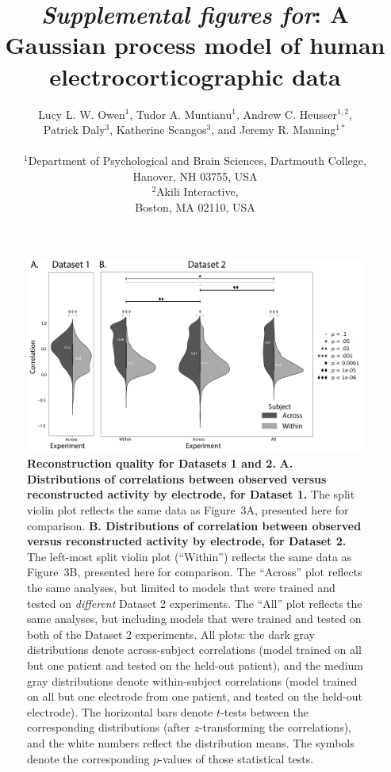 \documentclass[10pt]{article}
\title{\textit{Supplemental figures for}: A Gaussian process model of human electrocorticographic data}
\author{
  Lucy L. W. Owen$^{1}$,
  Tudor A. Muntianu$^{1}$,
  Andrew C. Heusser$^{1, 2}$, \\
  Patrick Daly$^{3}$,
  Katherine Scangos$^{3}$, and
  Jeremy R. Manning$^{1\ast}$\\\\
$^{1}$Department of Psychological and Brain Sciences, Dartmouth College,\\
Hanover, NH 03755, USA\\
$^{2}$Akili Interactive,\\
Boston, MA 02110, USA}
\begin{document}
\setcounter{equation}{0}
\setcounter{figure}{0}
\setcounter{table}{0}
\setcounter{page}{1}
\setcounter{section}{0}
\makeatletter
\renewcommand{\theequation}{S\arabic{equation}}
\renewcommand{\thefigure}{S\arabic{figure}}

\begin{titlepage}
  \maketitle
\end{titlepage}

\begin{figure}[b!]
\centering
\includegraphics[width=\textwidth]{figs/supplemental_1}
\caption{\textbf{Reconstruction quality for Datasets 1 and 2.}
  \textbf{A. Distributions of correlations between observed versus
    reconstructed activity by electrode, for Dataset 1.} The split
  violin plot reflects the same data as Figure~3A, presented here for
  comparison.  \textbf{B. Distributions of correlation between
    observed versus reconstructed activity by electrode, for Dataset
    2.}  The left-most split violin plot (``Within'') reflects the
  same data as Figure~3B, presented here for comparison.  The
  ``Across'' plot reflects the same analyses, but limited to models
  that were trained and tested on \textit{different} Dataset 2
  experiments.  The ``All'' plot reflects the same analyses, but
  including models that were trained and tested on both of the Dataset
  2 experiments.  All plots: the dark gray distributions denote
  across-subject correlations (model trained on all but one patient
  and tested on the held-out patient), and the medium gray
  distributions denote within-subject correlations (model trained on
  all but one electrode from one patient, and tested on the held-out
  electrode).  The horizontal bars denote $t$-tests between the
  corresponding distributions (after $z$-transforming the
  correlations), and the white numbers reflect the distribution means.
  The symbols denote the corresponding $p$-values of those statistical
  tests.}
\label{fig:supplemental_1}
\end{figure}
\end{document}
